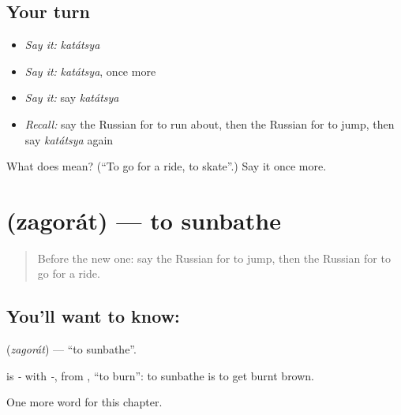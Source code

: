 \subsection*{Your turn}
\begin{itemize}
\raggedright
  \item \emph{Say it:} \emph{katátsya}
  \item \emph{Say it:} \emph{katátsya}, once more
  \item \emph{Say it:} say \emph{katátsya}
  \item \emph{Recall:} say the Russian for to run about, then the Russian for to jump, then say \emph{katátsya} again
\end{itemize}

\begin{tcolorbox}[breakable,colback=teal!4,colframe=teal!35!black,title={Before you move on}]
What does  mean? (\textquotedblleft{}To go for a ride, to skate\textquotedblright{}.) Say it once more.
\end{tcolorbox}
\section[\texorpdfstring{\ru{загорать} (zagorát)}{загорать (zagorát)}]{ (zagorát) — to sunbathe}

\label{lesson:RU-C178-zagorat}



\begin{quote}
Before the new one: say the Russian for to jump, then the Russian for to go for a ride.
\end{quote}

\subsection*{You'll want to know: }
\textbf{} (\emph{zagorát}) — \textquotedblleft{}to sunbathe\textquotedblright{}.

\begin{cousinweb}
\textbf{} is \emph{-} with \emph{-}, from \emph{}, \textquotedblleft{}to burn\textquotedblright{}: to sunbathe is to get burnt brown.
\end{cousinweb}

\begin{grammarlens}[title={What you've built}]
One more word for this chapter.
\end{grammarlens}

